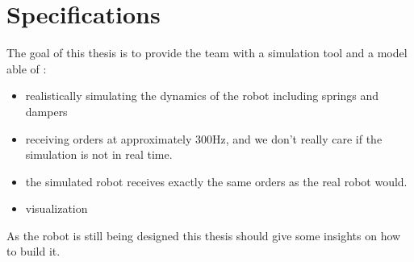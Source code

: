 \section{Specifications}
The goal of this thesis is to provide the team with a simulation tool and a model able of :
\begin{itemize}
\item realistically simulating the dynamics of the robot including springs and dampers
\item receiving orders at approximately 300Hz, and we don't really care if the simulation is not in real time.
\item the simulated robot receives exactly the same orders as the real robot would.
\item visualization
\end{itemize}
As the robot is still being designed this thesis should give some insights on how to build it.